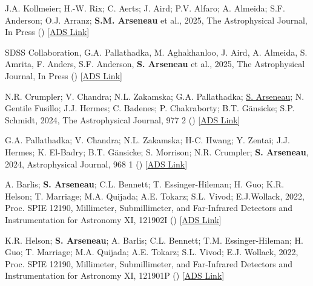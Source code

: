 \documentclass[12pt,letterpaper]{article}
\begin{document}
\begin{list}{}{\cvlist}
  \item[{\color{numcolor}\scriptsize6}] J.A. Kollmeier; H.-W. Rix; C. Aerts; J. Aird; P.V. Alfaro; A. Almeida; S.F. Anderson; O.J. Arranz; \textbf{S.M. Arseneau} et al., 2025,  The Astrophysical Journal, In Press () [\href{https://ui.adsabs.harvard.edu/abs/2025arXiv250706989K}{ADS Link}]
  
  \item[{\color{numcolor}\scriptsize5}] SDSS Collaboration, G.A. Pallathadka, M. Aghakhanloo, J. Aird, A. Almeida, S. Amrita, F. Anders, S.F. Anderson, \textbf{S. Arseneau} et al., 2025,  The Astrophysical Journal, In Press () [\href{https://ui.adsabs.harvard.edu/abs/2025arXiv250707093S}{ADS Link}]
  
  \item[{\color{numcolor}\scriptsize4}] N.R. Crumpler; V. Chandra; N.L. Zakamska; G.A. Pallathadka; \underline{S. Arseneau}; N. Gentile Fusillo; J.J. Hermes; C. Badenes; P. Chakraborty; B.T. Gänsicke; S.P. Schmidt, 2024,  The Astrophysical Journal, 977 2 () [\href{https://ui.adsabs.harvard.edu/abs/2024ApJ...977..237C}{ADS Link}]
  
  \item[{\color{numcolor}\scriptsize3}]  G.A. Pallathadka; V. Chandra; N.L. Zakamska; H-C. Hwang; Y. Zentai; J.J. Hermes; K. El-Badry; B.T. G\"ansicke; S. Morrison; N.R. Crumpler; \textbf{S. Arseneau}, 2024,  Astrophysical Journal, 968 1 () [\href{https://ui.adsabs.harvard.edu/abs/2024ApJ...968...42A}{ADS Link}]
  
  \item[{\color{numcolor}\scriptsize2}] A. Barlis; \textbf{S. Arseneau}; C.L. Bennett; T. Essinger-Hileman; H. Guo; K.R. Helson; T. Marriage; M.A. Quijada; A.E. Tokarz; S.L. Vivod; E.J.Wollack, 2022,  Proc. SPIE 12190, Millimeter, Submillimeter, and Far-Infrared Detectors and Instrumentation for Astronomy XI, 121902I () [\href{https://ui.adsabs.harvard.edu/abs/2022SPIE12190E..2IB}{ADS Link}]

  \item[{\color{numcolor}\scriptsize1}] K.R. Helson; \textbf{S. Arseneau}; A. Barlis; C.L. Bennett; T.M. Essinger-Hileman; H. Guo; T. Marriage; M.A. Quijada; A.E. Tokarz; S.L. Vivod; E.J. Wollack, 2022,  Proc. SPIE 12190, Millimeter, Submillimeter, and Far-Infrared Detectors and Instrumentation for Astronomy XI, 121901P () [\href{https://ui.adsabs.harvard.edu/abs/2022SPIE12190E..1PH}{ADS Link}]
\end{list}
\end{document}
